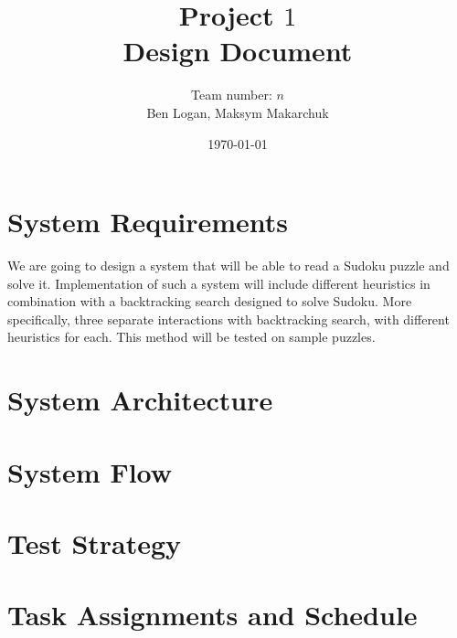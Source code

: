 \documentclass[12pt]{article}
\title{Project $1$ \\ Design Document}
\author{Team number: $n$ \\ Ben Logan, Maksym Makarchuk}
\date{\today}
\begin{document}
\maketitle

\section{System Requirements}
We are going to design a system that will be able to read a Sudoku puzzle and solve it. 
Implementation of such a system will include different heuristics in combination with a 
backtracking search designed to solve Sudoku. More specifically, three separate interactions 
with backtracking search, with different heuristics for each. This method will be tested on sample puzzles.  
\section{System Architecture}
\section{System Flow}
\section{Test Strategy}
\section{Task Assignments and Schedule}
\end{document}
